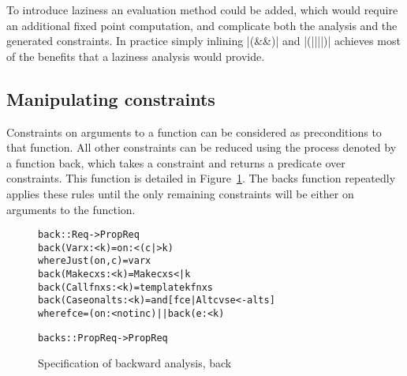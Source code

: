 \documentclass[preprint]{sigplanconf}
\newcommand{\C}[1]{\textsf{#1}}
\newenvironment{code}{\begin{alltt}\small}{\end{alltt}}
\begin{document}
To introduce laziness an evaluation method could be added, which would require an additional fixed point computation, and complicate both the analysis and the generated constraints. In practice simply inlining |(&&)| and |(||||)| achieves most of the benefits that a laziness analysis would provide.


\subsection{Manipulating constraints}
\label{sec:backward}

Constraints on arguments to a function can be considered as preconditions to that function. All other constraints can be reduced using the process denoted by a function \C{back}, which takes a constraint and returns a predicate over constraints. This function is detailed in Figure~\ref{fig:backward}. The \C{backs} function repeatedly applies these rules until the only remaining constraints will be either on arguments to the function.

\begin{figure}
\begin{code}
back :: Req -> Prop Req
back (Var   x         :< k) = on :< (c |> k)
    where Just (on, c) = var x
back (Make  c   xs    :< k) = Make c xs <| k
back (Call  fn  xs    :< k) = template k fn xs
back (Case  on  alts  :< k) = and [f c e | Alt c vs e <- alts]
    where f c e = (on :< notin c) || back (e :< k)

backs :: Prop Req -> Prop Req
\end{code}
\caption{Specification of backward analysis, \C{back}}
\label{fig:backward}
\end{figure}
\end{document}
